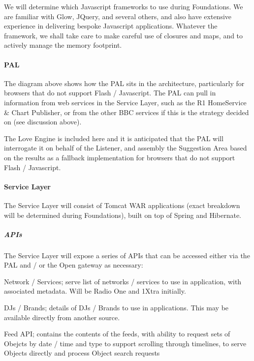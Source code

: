 \documentclass[a4paper, 11pt]{scrreprt}
\begin{document}
We will determine which Javascript frameworks to use during Foundations. We are familiar with Glow, JQuery, and several others, and also have extensive experience in delivering bespoke Javascript applications. Whatever the framework, we shall take care to make careful use of closures and maps, and to actively manage the memory footprint.


\paragraph{PAL}
\label{h.dnw0kr2shwea}
The diagram above shows how the PAL sits in the architecture, particularly for browsers that do not support Flash / Javascript. The PAL can pull in information from web services in the Service Layer, such as the R1 HomeService \& Chart Publisher, or from the other BBC services if this is the strategy decided on (see discussion above).

The Love Engine is included here and it is anticipated that the PAL will interrogate it on behalf of the Listener, and assembly the Suggestion Area based on the results as a fallback implementation for browsers that do not support Flash / Javascript.


\paragraph{Service Layer}
\label{h.3d6kekybonwo}
The Service Layer will consist of Tomcat WAR applications (exact breakdown will be determined during Foundations), built on top of Spring and Hibernate. 


\subparagraph{APIs}
\label{h.7dsknz95uy9x}
The Service Layer will expose a series of APIs that can be accessed either via the PAL and / or the Open gateway as necessary:



\begin{tystrul}


\item Network / Services; serve list of networks / services to use in application, with associated metadata. Will be Radio One and 1Xtra initially.

\item DJs / Brands; details of DJs / Brands to use in applications. This may be available directly from another source.

\item Feed API; contains the contents of the feeds, with ability to request sets of Obejcts by date / time and type to support scrolling through timelines, to serve Objects directly and process Object search requests

\end{tystrul}
\end{document}
